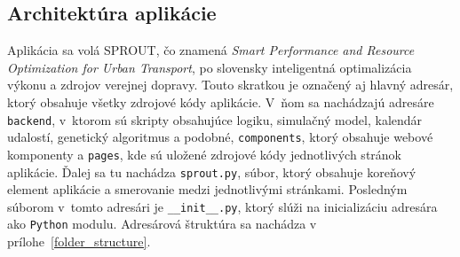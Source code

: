 \subsection*{Architektúra aplikácie}
Aplikácia sa volá SPROUT, čo znamená \textit{Smart Performance and Resource Optimization for Urban Transport}, po slovensky inteligentná optimalizácia výkonu a zdrojov verejnej dopravy.
Touto skratkou je označený aj hlavný adresár, ktorý obsahuje všetky zdrojové kódy aplikácie.
V~ňom sa nachádzajú adresáre \texttt{backend}, v~ktorom sú skripty obsahujúce logiku, simulačný model, kalendár udalostí, genetický algoritmus a podobné, \texttt{components}, ktorý obsahuje webové komponenty a \texttt{pages}, kde sú uložené zdrojové kódy jednotlivých stránok aplikácie.
Ďalej sa tu nachádza \texttt{sprout.py}, súbor, ktorý obsahuje koreňový element aplikácie a smerovanie medzi jednotlivými stránkami.
Posledným súborom v~tomto adresári je \texttt{\_\_init\_\_.py}, ktorý slúži na inicializáciu adresára ako \texttt{Python} modulu.
Adresárová štruktúra sa nachádza v prílohe~\ref{folder_structure}.


